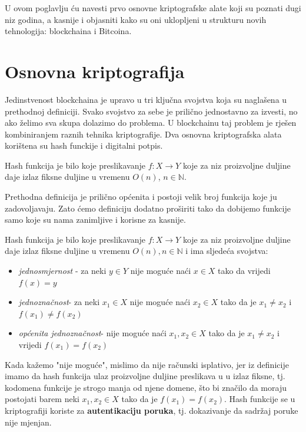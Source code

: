 \documentclass[a4paper,oneside,12pt]{memoir} %
\begin{document}
U ovom poglavlju ću navesti prvo osnovne kriptografske alate koji su poznati dugi niz godina, a kasnije i objasniti kako su oni uklopljeni u strukturu novih tehnologija:  blockchaina i Bitcoina.

\section{Osnovna kriptografija}
Jedinstvenost blockchaina je upravo u tri ključna svojstva koja su naglašena u prethodnoj definiciji. Svako svojstvo za sebe je prilično jednostavno za izvesti, no ako želimo sva skupa dolazimo do problema. U blockchainu taj problem je rješen kombiniranjem raznih tehnika kriptografije. Dva osnovna kriptografska alata korištena su hash funckije i digitalni potpis. 

\begin{definicija} 
Hash funkcija je bilo koje preslikavanje $f\colon X \to Y$ koje za niz proizvoljne duljine daje izlaz fiksne duljine u vremenu $O(n)$, $n \in \mathbb{N}$. 
\end{definicija}

Prethodna definicija je prilično općenita i postoji velik broj funkcija koje ju zadovoljavaju. Zato ćemo definiciju dodatno proširiti tako da dobijemo funkcije samo koje su nama zanimljive i korisne za kasnije.

\begin{definicija}
Hash funkcija je bilo koje preslikavanje $f\colon X \to Y$ koje za niz proizvoljne duljine daje izlaz fiksne duljine u vremenu $O(n), n \in \mathbb{N}$ i ima sljedeća svojstva:
\begin{itemize}
    \item \textit{jednosmjernost} - za neki $y \in Y$ nije moguće naći $x \in X$ tako da vrijedi $f(x)=y$
    \item \textit{jednoznačnost}- za neki $x_{1} \in X$ nije moguće naći $x_{2} \in X$ tako da je $x_{1}\not=x_{2}$ i $f(x_{1}) \not= f(x_{2})$
    \item \textit{općenita jednoznačnost}- nije moguće naći $x_{1}, x_{2} \in X$ tako da je $x_{1} \not= x_{2}$ i vrijedi $f(x_{1}) = f(x_{2})$
\end{itemize}
\end{definicija}

Kada kažemo "nije moguće", mislimo da nije računski isplativo, jer iz definicije imamo da hash funkcija ulaz proizvoljne duljine preslikava u u izlaz fiksne, tj. kodomena funkcije je strogo manja od njene domene, što bi značilo da moraju postojati barem neki $x_{1}, x_{2} \in X$ tako da je $f(x_{1}) = f(x_{2})$. Hash funkcije se u kriptografiji koriste za \textbf{autentikaciju poruka}, tj. dokazivanje da sadržaj poruke nije mjenjan. 
\end{document}
